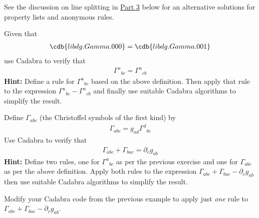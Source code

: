 \documentclass[a4paper,12pt]{article}
\numberwithin{equation}{section}%
\begin{document}
See the discussion on line splitting in \hyperlink{link2part3}{Part 3} below for an
alternative solutions for property lists and anonymous rules.


\begin{Exercises}

   \begin{Exercise}
      Given that
      \begin{align*}
         \cdb{libdg.Gamma.000} = \cdb{libdg.Gamma.001}
      \end{align*}
      use Cadabra to verify that
      \begin{align*}
         \Gamma^{a}{}_{bc} = \Gamma^{a}{}_{cb}
      \end{align*}
      {\bf Hint:} Define a rule for $\Gamma^{a}{}_{bc}$ based on the above definition.
      Then apply that rule to the expression $\Gamma^{a}{}_{bc} - \Gamma^{a}{}_{cb}$ and
      finally use suitable Cadabra algorithms to simplify the result.
   \end{Exercise}


   \begin{Exercise}
      Define $\Gamma_{abc}$ (the Christoffel symbols of the first kind) by
      \begin{align*}
         \Gamma_{abc} = g_{ad} \Gamma^{d}{}_{bc}
      \end{align*}
      Use Cadabra to verify that
      \begin{align*}
         \Gamma_{abc} + \Gamma_{bac} = \partial_{c} g_{ab}
      \end{align*}
      {\bf Hint:} Define two rules, one for $\Gamma^{a}{}_{bc}$ as per the previous exercise
      and one for $\Gamma_{abc}$ as per the above definition. Apply both rules to the
      expression $\Gamma_{abc} + \Gamma_{bac} - \partial_{c} g_{ab}$ then use suitable
      Cadabra algorithms to simplify the result.
   \end{Exercise}

   \begin{Exercise}
      Modify your Cadabra code from the previous example to apply just \emph{one} rule to
      $\Gamma_{abc} + \Gamma_{bac} - \partial_{c} g_{ab}$.


\end{Exercise}
\end{Exercises}
\end{document}
